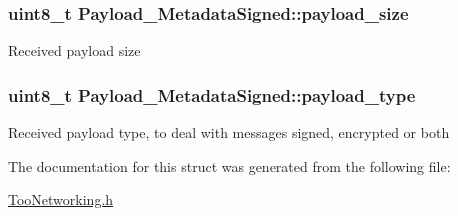 \subsubsection[{\texorpdfstring{payload\+\_\+size}{payload_size}}]{\setlength{\rightskip}{0pt plus 5cm}uint8\+\_\+t Payload\+\_\+\+Metadata\+Signed\+::payload\+\_\+size}\hypertarget{structPayload__MetadataSigned_acc293d1cef4a0c121149eb68a834b4ea}{}\label{structPayload__MetadataSigned_acc293d1cef4a0c121149eb68a834b4ea}
Received payload size 
\subsubsection[{\texorpdfstring{payload\+\_\+type}{payload_type}}]{\setlength{\rightskip}{0pt plus 5cm}uint8\+\_\+t Payload\+\_\+\+Metadata\+Signed\+::payload\+\_\+type}\hypertarget{structPayload__MetadataSigned_a05467542863d8bfb345c11f8ccefd852}{}\label{structPayload__MetadataSigned_a05467542863d8bfb345c11f8ccefd852}
Received payload type, to deal with messages signed, encrypted or both 

The documentation for this struct was generated from the following file\+:\begin{DoxyCompactItemize}
\item 
\hyperlink{TooNetworking_8h}{Too\+Networking.\+h}\end{DoxyCompactItemize}
